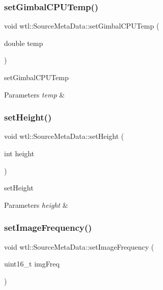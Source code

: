 \subsubsection{\texorpdfstring{set\+Gimbal\+C\+P\+U\+Temp()}{setGimbalCPUTemp()}}
{\footnotesize\ttfamily void wtl\+::\+Source\+Meta\+Data\+::set\+Gimbal\+C\+P\+U\+Temp (\begin{DoxyParamCaption}\item[{double}]{temp }\end{DoxyParamCaption})}



set\+Gimbal\+C\+P\+U\+Temp 


\begin{DoxyParams}{Parameters}
{\em temp} & \\
\hline
\end{DoxyParams}
\mbox{\label{classwtl_1_1_source_meta_data_af2b87e293f1a6ce5a5920752abef850f}} 
\subsubsection{\texorpdfstring{set\+Height()}{setHeight()}}
{\footnotesize\ttfamily void wtl\+::\+Source\+Meta\+Data\+::set\+Height (\begin{DoxyParamCaption}\item[{int}]{height }\end{DoxyParamCaption})}



set\+Height 


\begin{DoxyParams}{Parameters}
{\em height} & \\
\hline
\end{DoxyParams}
\mbox{\label{classwtl_1_1_source_meta_data_a361f603d20e3084820e3869e19ec8f40}} 
\subsubsection{\texorpdfstring{set\+Image\+Frequency()}{setImageFrequency()}}
{\footnotesize\ttfamily void wtl\+::\+Source\+Meta\+Data\+::set\+Image\+Frequency (\begin{DoxyParamCaption}\item[{uint16\+\_\+t}]{img\+Freq }\end{DoxyParamCaption})}



